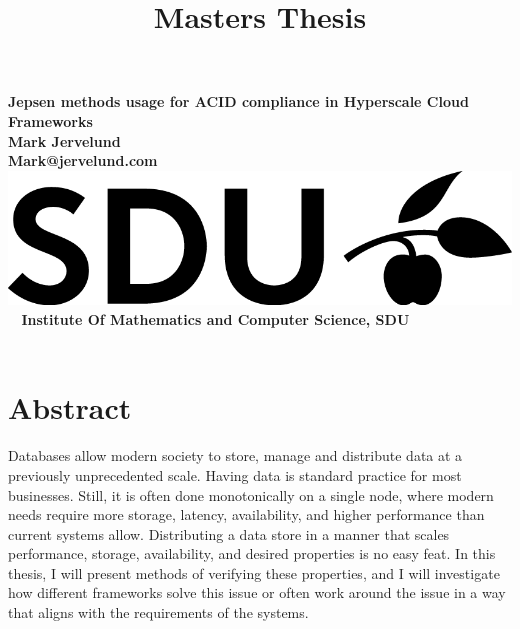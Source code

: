 \documentclass[a4paper,10pt,titlepage]{report}
\date{}
\title{Masters Thesis}
\begin{document}
    \begin{titlepage}
        \centering
        \vspace*{9\baselineskip}
        \huge
        \bfseries
        Jepsen methods usage for ACID compliance in Hyperscale Cloud Frameworks \\
        \normalfont
        Mark Jervelund \\
        Mark@jervelund.com \\
        \vspace*{9\baselineskip}
        \normalfont
        \includegraphics[scale=1]{logos/SDU_BLACK.png}
        \vfill\
        \vspace{5mm}
        Institute Of Mathematics and Computer Science, SDU \\

        \textbf{\datedate} \\[2\baselineskip]
    \end{titlepage}

    \renewcommand{\thepage}{\roman{page}}%
    \tableofcontents
    \newpage
    \setcounter{page}{1}
    \renewcommand{\thepage}{\arabic{page}}


    \section*{Abstract}

    Databases allow modern society to store, manage and distribute data at a previously unprecedented scale. Having data is standard practice for most businesses. Still, it is often done monotonically on a single node, where modern needs require more storage, latency, availability, and higher performance than current systems allow. Distributing a data store in a manner that scales performance, storage, availability, and desired properties is no easy feat. In this thesis, I will present methods of verifying these properties, and I will investigate how different frameworks solve this issue or often work around the issue in a way that aligns with the requirements of the systems. \\
    \vspace{5mm}
\end{document}
